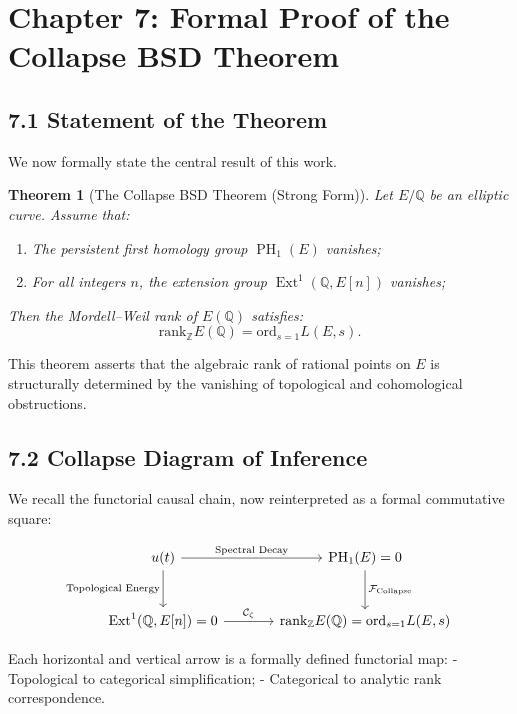 \documentclass[11pt]{article}
\newtheorem{theorem}{Theorem}[section]
\DeclareMathOperator{\Ext}{Ext}
\DeclareMathOperator{\PH}{PH}
\begin{document}
\section{Chapter 7: Formal Proof of the Collapse BSD Theorem}

\subsection{7.1 Statement of the Theorem}

We now formally state the central result of this work.

\begin{theorem}[The Collapse BSD Theorem (Strong Form)]
\label{thm:collapse-bsd}
Let $E/\mathbb{Q}$ be an elliptic curve.  
Assume that:

\begin{enumerate}
  \item The persistent first homology group $\PH_1(E)$ vanishes;
  \item For all integers $n$, the extension group $\Ext^1(\mathbb{Q},E[n])$ vanishes;
\end{enumerate}

Then the Mordell–Weil rank of $E(\mathbb{Q})$ satisfies:
\[
\mathrm{rank}_{\mathbb{Z}} E(\mathbb{Q}) = \mathrm{ord}_{s=1} L(E,s).
\]
\end{theorem}

This theorem asserts that the algebraic rank of rational points on $E$ is structurally determined by the vanishing of topological and cohomological obstructions.

\subsection{7.2 Collapse Diagram of Inference}

We recall the functorial causal chain, now reinterpreted as a formal commutative square:

\[
\begin{tikzcd}[row sep=large, column sep=large]
u(t) \arrow[r, "\text{Spectral Decay}"] \arrow[d, "\text{Topological Energy}"']
& \PH_1(E) = 0 \arrow[d, "\mathcal{F}_{\mathrm{Collapse}}"] \\
\Ext^1(\mathbb{Q},E[n]) = 0 \arrow[r, "\mathcal{C}_{\zeta}"]
& \mathrm{rank}_{\mathbb{Z}} E(\mathbb{Q}) = \mathrm{ord}_{s=1} L(E,s)
\end{tikzcd}
\]

Each horizontal and vertical arrow is a formally defined functorial map:
- Topological to categorical simplification;
- Categorical to analytic rank correspondence.
\end{document}
